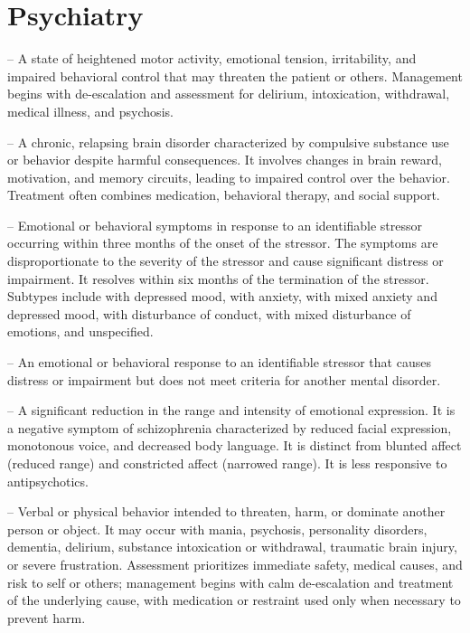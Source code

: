 \chapter{Psychiatry}

-- A state of heightened motor activity, emotional tension, irritability, and impaired behavioral control that may threaten the patient or others. Management begins with de-escalation and assessment for delirium, intoxication, withdrawal, medical illness, and psychosis.

-- A chronic, relapsing brain disorder characterized by compulsive substance use or behavior despite harmful consequences. It involves changes in brain reward, motivation, and memory circuits, leading to impaired control over the behavior. Treatment often combines medication, behavioral therapy, and social support.

-- Emotional or behavioral symptoms in response to an identifiable stressor occurring within three months of the onset of the stressor. The symptoms are disproportionate to the severity of the stressor and cause significant distress or impairment. It resolves within six months of the termination of the stressor. Subtypes include with depressed mood, with anxiety, with mixed anxiety and depressed mood, with disturbance of conduct, with mixed disturbance of emotions, and unspecified.

-- An emotional or behavioral response to an identifiable stressor that causes distress or impairment but does not meet criteria for another mental disorder.

-- A significant reduction in the range and intensity of emotional expression. It is a negative symptom of schizophrenia characterized by reduced facial expression, monotonous voice, and decreased body language. It is distinct from blunted affect (reduced range) and constricted affect (narrowed range). It is less responsive to antipsychotics.

-- Verbal or physical behavior intended to threaten, harm, or dominate another person or object. It may occur with mania, psychosis, personality disorders, dementia, delirium, substance intoxication or withdrawal, traumatic brain injury, or severe frustration. Assessment prioritizes immediate safety, medical causes, and risk to self or others; management begins with calm de-escalation and treatment of the underlying cause, with medication or restraint used only when necessary to prevent harm.

